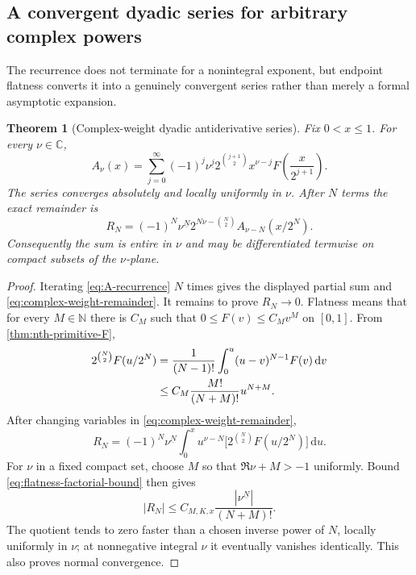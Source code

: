 \documentclass[11pt,oneside]{article}
\newtheorem{theorem}{Theorem}[section]
\theoremstyle{definition}
\theoremstyle{remark}
\newcommand{\C}{\mathbb C}
\newcommand{\N}{\mathbb N}
\newcommand{\dd}{\,\mathrm d}
\newcommand{\falling}[2]{#1^{\underline{#2}}}
\begin{document}
\subsection{A convergent dyadic series for arbitrary complex powers}

The recurrence does not terminate for a nonintegral exponent, but endpoint flatness converts it into a genuinely convergent series rather than merely a formal asymptotic expansion.

\begin{theorem}[Complex-weight dyadic antiderivative series]\label{thm:complex-weight-series}
Fix $0<x\le1$.  For every $\nu\in\C$,
\begin{equation}\label{eq:complex-weight-series}
\boxed{
 A_\nu(x)=
 \sum_{j=0}^{\infty}(-1)^j\falling{\nu}{j}
 2^{\binom{j+1}{2}}x^{\nu-j}
 F\!\left(\frac{x}{2^{j+1}}\right).}
\end{equation}
The series converges absolutely and locally uniformly in $\nu$.  After $N$ terms the exact remainder is
\begin{equation}\label{eq:complex-weight-remainder}
 R_N=(-1)^N\falling{\nu}{N}
 2^{N\nu-\binom N2}A_{\nu-N}(x/2^N).
\end{equation}
Consequently the sum is entire in $\nu$ and may be differentiated termwise on compact subsets of the $\nu$-plane.
\end{theorem}

\begin{proof}
Iterating \eqref{eq:A-recurrence} $N$ times gives the displayed partial sum and \eqref{eq:complex-weight-remainder}.  It remains to prove $R_N\to0$.  Flatness means that for every $M\in\N$ there is $C_M$ such that $0\le F(v)\le C_Mv^M$ on $[0,1]$.  From \cref{thm:nth-primitive-F},
\begin{align}
 2^{\binom N2}F(u/2^N)
 &=\frac1{(N-1)!}\int_0^u(u-v)^{N-1}F(v)\dd v\notag\\
 &\le C_M\frac{M!}{(N+M)!}u^{N+M}.\label{eq:flatness-factorial-bound}
\end{align}
After changing variables in \eqref{eq:complex-weight-remainder},
\[
 R_N=(-1)^N\falling{\nu}{N}
 \int_0^x u^{\nu-N}
 \bigl[2^{\binom N2}F(u/2^N)\bigr]\dd u.
\]
For $\nu$ in a fixed compact set, choose $M$ so that $\Re\nu+M>-1$ uniformly.  Bound \eqref{eq:flatness-factorial-bound} then gives
\[
 |R_N|\le C_{M,K,x}\frac{|\falling{\nu}{N}|}{(N+M)!}.
\]
The quotient tends to zero faster than a chosen inverse power of $N$, locally uniformly in $\nu$; at nonnegative integral $\nu$ it eventually vanishes identically.  This also proves normal convergence.
\end{proof}
\end{document}
